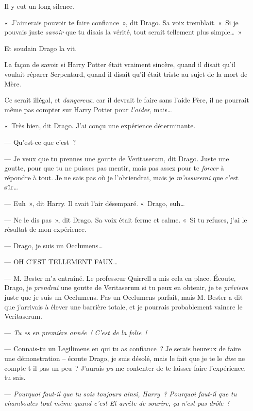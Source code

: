 Il y eut un long silence.

«~J'aimerais pouvoir te faire confiance~», dit Drago.
Sa voix tremblait.
«~Si je pouvais juste \emph{savoir} que tu disais la vérité, tout serait tellement plus simple…~»

Et soudain Drago la vit.

La façon de savoir si Harry Potter était vraiment sincère, quand il disait qu'il voulait réparer Serpentard, quand il disait qu'il était triste au sujet de la mort de Mère.

Ce serait illégal, et \emph{dangereux}, car il devrait le faire sans l'aide Père, il ne pourrait même pas compter sur Harry Potter pour \emph{l'aider}, mais…

«~Très bien, dit Drago.
J'ai conçu une expérience déterminante.

--- Qu'est-ce que c'est~?

--- Je veux que tu prennes une goutte de Veritaserum, dit Drago.
Juste une goutte, pour que tu ne puisses pas mentir, mais pas assez pour te \emph{forcer} à répondre à tout.
Je ne sais pas où je l'obtiendrai, mais je \emph{m'assurerai} que c'est sûr…

--- Euh~», dit Harry.
Il avait l'air désemparé.
«~Drago, euh…

--- Ne le dis pas~», dit Drago.
Sa voix était ferme et calme.
«~Si tu refuses, j'ai le résultat de mon expérience.

--- Drago, je suis un Occlumens…

--- OH C'EST TELLEMENT FAUX…

--- M. Bester m'a entraîné.
Le professeur Quirrell a mis cela en place.
Écoute, Drago, je \emph{prendrai} une goutte de Veritaserum si tu peux en obtenir, je te \emph{préviens} juste que je suis un Occlumens.
Pas un Occlumens parfait, mais M. Bester a dit que j'arrivais à élever une barrière totale, et je pourrais probablement vaincre le Veritaserum.

--- \emph{Tu es en première année~!
C'est de la folie~!}

--- Connais-tu un Legilimens en qui tu as confiance~?
Je serais heureux de faire une démonstration -- écoute Drago, je suis désolé, mais le fait que je te le \emph{dise} ne compte-t-il pas un peu~?
J'aurais \emph{pu} me contenter de te laisser faire l'expérience, tu sais.

--- \emph{ Pourquoi faut-il que tu sois toujours ainsi, Harry~?
Pourquoi faut-il que tu chamboules tout même quand c'est  Et arrête de sourire, ça n'est pas drôle~!}

